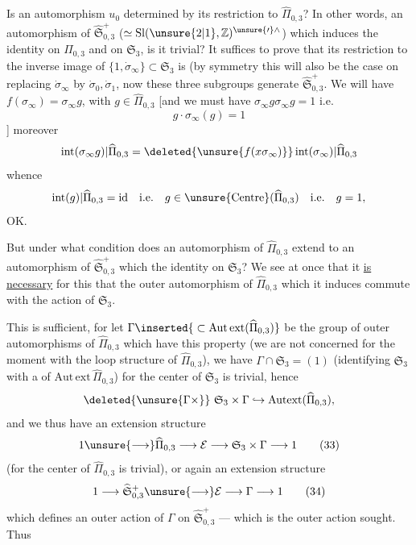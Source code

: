 
Is  an automorphism $u_0$ determined by its restriction to $\widehat\Pi_{0,3}$? In other words, an automorphism of $\widehat{\mathfrak S}_{0,3}^{+}$  ($\simeq\mathrm{Sl}(\unsure{2|1},\mathbb Z)^{\unsure{\prime}\wedge}$) which induces the identity on $\widehat\Pi_{0,3}$ and on $\mathfrak S_{3}$, is it trivial? It suffices to prove that its restriction to the inverse image  of $\{1,\dot\sigma_\infty\}\subset\mathfrak S_{3}$ is  (by symmetry this will also be the case on replacing $\dot\sigma_\infty$ by $\dot\sigma_0,\dot\sigma_1$, now these three subgroups generate $\widehat{\mathfrak S}_{0,3}^{+}$. We will have $f(\sigma_\infty)=\sigma_\infty g$, with $g\in\widehat\Pi_{0,3}$ [and we must have $\sigma_\infty g\sigma_\infty g=1$ i.e.
\[
g\cdot\sigma_\infty(g)=1
\]
]
moreover  
\[
\operatorname{int}(\sigma_\infty g)\vert\widehat\Pi_{0,3}
=\deleted{\unsure{f(x\sigma_\infty)}}\operatorname{int}(\sigma_\infty)\vert\widehat\Pi_{0,3}
\]
whence 
\[
\operatorname{int}(g)\vert\widehat\Pi_{0,3}=\mathrm{id}
\quad\text{i.e.}\quad
g\in\unsure{\operatorname{Centre}}(\widehat\Pi_{0,3})
\quad\text{i.e.}\quad g=1,
\]
OK.

But under what condition does an automorphism of $\widehat\Pi_{0,3}$  extend to an automorphism of $\widehat{\mathfrak S}_{0,3}^{+}$ which  the identity on $\mathfrak S_{3}$? We see at once that it \uline{is necessary} for this that the outer automorphism of $\widehat\Pi_{0,3}$ which it induces commute with the action of $\mathfrak S_{3}$.


This is sufficient, for let $\Gamma\inserted{{}\subset\mathrm{Aut\,ext}(\widehat{\Pi}_{0,3})}$ be the group of outer
automorphisms of $\widehat{\Pi}_{0,3}$ which have this property (we are not
concerned for the moment with the
loop structure of $\widehat{\Pi}_{0,3}$), we have
$\Gamma\cap\mathfrak S_3=(1)$ (identifying $\mathfrak S_3$ with a
 of $\mathrm{Aut\,ext}\,\widehat{\Pi}_{0,3}$) for  the center
of $\mathfrak S_3$ is trivial, hence
\[
\deleted{\unsure{\Gamma\times}}\ \mathfrak S_3\times\Gamma\hookrightarrow\mathrm{Autext}(\widehat{\Pi}_{0,3}),
\]
and we thus have an extension structure
\[
1\unsure{\longrightarrow}\widehat{\Pi}_{0,3}\longrightarrow\mathcal E\longrightarrow\mathfrak S_3\times\Gamma\longrightarrow1
\tag{33}
\]
(for the center of $\widehat{\Pi}_{0,3}$ is trivial), or again
an extension structure
\[
1\longrightarrow\widehat{\mathfrak S}_{0,3}^{+}\unsure{\longrightarrow}\mathcal E\longrightarrow\Gamma\longrightarrow1
\tag{34}
\]
which defines an outer action of $\Gamma$
on $\widehat{\mathfrak S}_{0,3}^{+}$ --- which is the outer action
sought. Thus

